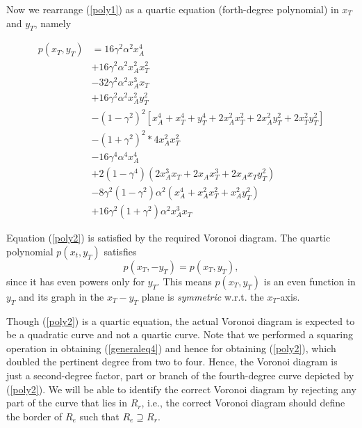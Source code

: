 Now we rearrange (\ref{poly1}) as a quartic equation (forth-degree polynomial) in $x_{T}$ and $y_{T}$, namely

\begin{equation}
\begin{split}
p(x_T,y_T)& = 16 \gamma^2 \alpha^2 x_A^4 \\
          &+ 16 \gamma^2 \alpha^2 x_A^2 x_T^2\\
          &- 32 \gamma^2 \alpha^2 x_A^3 x_T \\
          &+ 16 \gamma^2 \alpha^2 x_A^2 y_T^2 \\
          &- (1-\gamma^2)^2 [x_A^4 + x_T^4 + y_T^4 + 2 x_A^2 x_T^2 
          + 2 x_A^2 y_T^2  +  2 x_T^2 y_T^2 ] \\
          &- (1 + \gamma^2)^2 * 4 x_A^2 x_T^2 \\ 
          &- 16 \gamma^4 \alpha^4 x_A^4 \\
          &+ 2 (1 - \gamma^4) (2 x_A^3 x_T + 2 x_A x_T^3 + 2 x_A x_T y_T^2) \\ 
          &- 8 \gamma^2 (1 - \gamma^2) \alpha^2 (x_A^4 + x_A^2 x_T^2 + x_A^2 y_T^2) \\
          &+ 16 \gamma^2 (1 + \gamma^2) \alpha^2 x_A^3 x_T
          \end{split}
          \label{poly2}
\end{equation}

Equation (\ref{poly2}) is satisfied by the required Voronoi diagram. The quartic polynomial $p(x_t,y_T)$ satisfies
\begin{equation}
p(x_T,-y_T)=p(x_T,y_T),
\end{equation}
since it has even powers only for $y_T$. This means $p(x_T,y_T)$ is an even function in $y_T$ and its graph in the $x_T-y_T$ plane is \textit{symmetric} w.r.t. the $x_T$-axis.

Though (\ref{poly2}) is a quartic equation, the actual Voronoi diagram is expected to be a quadratic curve and not a quartic curve.
Note that we performed a squaring operation in obtaining (\ref{generaleq4}) and hence for obtaining (\ref{poly2}), which doubled the pertinent degree from two to four. Hence, the Voronoi diagram is just a second-degree factor, part or branch of the fourth-degree curve depicted by (\ref{poly2}). We will be able to identify the correct Voronoi diagram by rejecting any part of the curve that lies in $R_{r}$, i.e., the correct Voronoi diagram should define the border of $R_{e}$ such that $R_{e}\supseteq R_{r}$.\\


